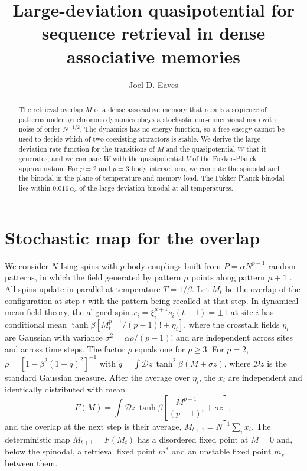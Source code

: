 \documentclass[aps,pre,twocolumn,superscriptaddress,floatfix]{revtex4-2}
\newcommand{\Dz}{\mathcal{D}z}
\begin{document}
\title{Large-deviation quasipotential for sequence retrieval in dense associative memories}

\author{Joel D. Eaves}

\begin{abstract}
The retrieval overlap $M$ of a dense associative memory that recalls a sequence of patterns under synchronous dynamics obeys a stochastic one-dimensional map with noise of order $N^{-1/2}$. The dynamics has no energy function, so a free energy cannot be used to decide which of two coexisting attractors is stable. We derive the large-deviation rate function for the transitions of $M$ and the quasipotential $W$ that it generates, and we compare $W$ with the quasipotential $V$ of the Fokker-Planck approximation. For $p=2$ and $p=3$ body interactions, we compute the spinodal and the binodal in the plane of temperature and memory load. The Fokker-Planck binodal lies within $0.016\,\alpha_c$ of the large-deviation binodal at all temperatures.
\end{abstract}

\maketitle

\section{Stochastic map for the overlap}

We consider $N$ Ising spins with $p$-body couplings \cite{AbbottArian1987,KrotovHopfield2016} built from $P=\alpha N^{p-1}$ random patterns, in which the field generated by pattern $\mu$ points along pattern $\mu+1$ \cite{SompolinskyKanter1986}. All spins update in parallel \cite{Little1974} at temperature $T=1/\beta$. Let $M_t$ be the overlap of the configuration at step $t$ with the pattern being recalled at that step. In dynamical mean-field theory, the aligned spin $x_i=\xi_i^{\mu+1}s_i(t+1)=\pm1$ at site $i$ has conditional mean $\tanh\beta[M_t^{p-1}/(p-1)!+\eta_i]$, where the crosstalk fields $\eta_i$ are Gaussian with variance $\sigma^2=\alpha\rho/(p-1)!$ and are independent across sites and across time steps. The factor $\rho$ equals one for $p\ge3$. For $p=2$, $\rho=[1-\beta^2(1-\tilde q)^2]^{-1}$ with $\tilde q=\int\!\Dz\,\tanh^2\beta(M+\sigma z)$, where $\Dz$ is the standard Gaussian measure. After the average over $\eta_i$, the $x_i$ are independent and identically distributed with mean
\begin{equation}
F(M)=\int\!\Dz\,\tanh\beta\!\left[\frac{M^{p-1}}{(p-1)!}+\sigma z\right],
\label{eq:F}
\end{equation}
and the overlap at the next step is their average, $M_{t+1}=N^{-1}\sum_i x_i$. The deterministic map $M_{t+1}=F(M_t)$ has a disordered fixed point at $M=0$ and, below the spinodal, a retrieval fixed point $m^*$ and an unstable fixed point $m_s$ between them.
\end{document}
